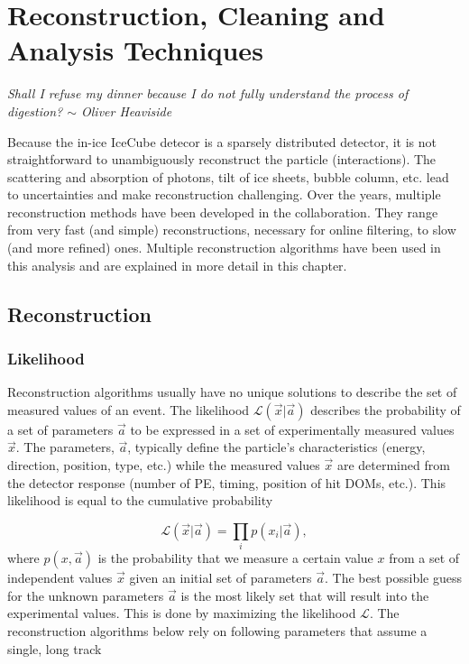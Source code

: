 \chapter{Reconstruction, Cleaning and Analysis Techniques}
\label{ch:reconstruction}
\begin{flushright}
\textit{Shall I refuse my dinner because I do not fully understand the process of digestion? $\sim$ Oliver Heaviside}
\end{flushright}
Because the in-ice IceCube detecor is a sparsely distributed detector, it is not straightforward to unambiguously reconstruct the particle (interactions). The scattering and absorption of photons, tilt of ice sheets, bubble column, etc. lead to uncertainties and make reconstruction challenging. Over the years, multiple reconstruction methods have been developed in the collaboration. They range from very fast (and simple) reconstructions, necessary for online filtering, to slow (and more refined) ones. Multiple reconstruction algorithms have been used in this analysis and are explained in more detail in this chapter.

\section{Reconstruction}

\subsection{Likelihood}
Reconstruction algorithms usually have no unique solutions to describe the set of measured values of an event. The likelihood $\mathcal{L}(\vec{x} |\vec{a})$ describes the probability of a set of parameters ${\vec{a}}$ to be expressed in a set of experimentally measured values ${\vec{x}}$. The parameters, ${\vec{a}}$, typically define the particle's characteristics (energy, direction, position, type, etc.) while the measured values ${\vec{x}}$ are determined from the detector response (number of PE, timing, position of hit DOMs, etc.). This likelihood is equal to the cumulative probability

\begin{equation}
\mathcal{L}(\vec{x}|\vec{a}) = \prod_i p(x_i|\vec{a}),
\end{equation}
\noindent where $p(x,\vec{a})$ is the probability that we measure a certain value $x$ from a set of independent values $\vec{x}$ given an initial set of parameters $\vec{a}$. The best possible guess for the unknown parameters $\vec{a}$ is the most likely set that will result into the experimental values. This is done by maximizing the likelihood $\mathcal{L}$. The reconstruction algorithms below rely on following parameters that assume a single, long track

